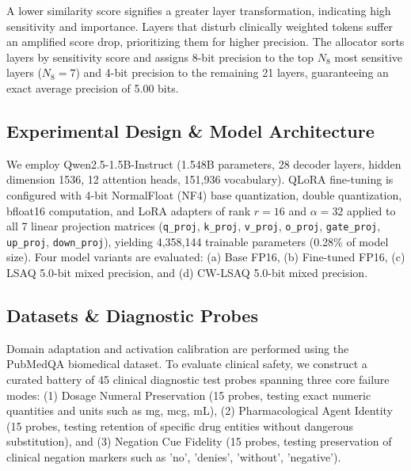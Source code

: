 \documentclass[conference]{IEEEtran}
\begin{document}
A lower similarity score signifies a greater layer transformation, indicating high sensitivity and importance. Layers that disturb clinically weighted tokens suffer an amplified score drop, prioritizing them for higher precision. The allocator sorts layers by sensitivity score and assigns 8-bit precision to the top $N_8$ most sensitive layers ($N_8 = 7$) and 4-bit precision to the remaining 21 layers, guaranteeing an exact average precision of 5.00 bits.

\subsection{Experimental Design \& Model Architecture}
We employ Qwen2.5-1.5B-Instruct (1.548B parameters, 28 decoder layers, hidden dimension 1536, 12 attention heads, 151,936 vocabulary). QLoRA fine-tuning is configured with 4-bit NormalFloat (NF4) base quantization, double quantization, bfloat16 computation, and LoRA adapters of rank $r = 16$ and $\alpha = 32$ applied to all 7 linear projection matrices (\texttt{q\_proj}, \texttt{k\_proj}, \texttt{v\_proj}, \texttt{o\_proj}, \texttt{gate\_proj}, \texttt{up\_proj}, \texttt{down\_proj}), yielding 4,358,144 trainable parameters (0.28\% of model size). Four model variants are evaluated: (a) Base FP16, (b) Fine-tuned FP16, (c) LSAQ 5.0-bit mixed precision, and (d) CW-LSAQ 5.0-bit mixed precision.

\subsection{Datasets \& Diagnostic Probes}
Domain adaptation and activation calibration are performed using the PubMedQA biomedical dataset. To evaluate clinical safety, we construct a curated battery of 45 clinical diagnostic test probes spanning three core failure modes: (1) Dosage Numeral Preservation (15 probes, testing exact numeric quantities and units such as mg, mcg, mL), (2) Pharmacological Agent Identity (15 probes, testing retention of specific drug entities without dangerous substitution), and (3) Negation Cue Fidelity (15 probes, testing preservation of clinical negation markers such as 'no', 'denies', 'without', 'negative').
\end{document}
